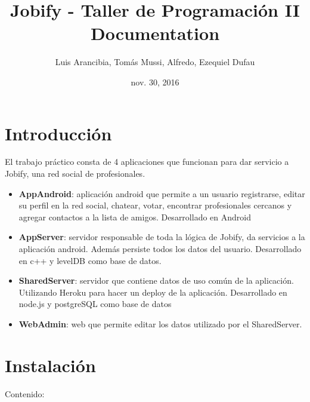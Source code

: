 \documentclass[letterpaper,10pt,spanish]{sphinxmanual}
\title{Jobify - Taller de Programación II Documentation}
\date{nov. 30, 2016}
\author{Luis Arancibia, Tomás Mussi, Alfredo, Ezequiel Dufau}
\begin{document}
\maketitle
\tableofcontents
{}\label{index::doc}



\chapter{Introducción}
\label{introduccion:welcome-to-jobify-taller-de-programacion-ii-s-documentation}\label{introduccion::doc}\label{introduccion:introduccion}
El trabajo práctico consta de 4 aplicaciones que funcionan para dar servicio a Jobify, una red social de profesionales.
\begin{itemize}
\item {} 
\textbf{AppAndroid}: aplicación android que permite a un usuario registrarse, editar su perfil en la red social, chatear, votar, encontrar profesionales cercanos y agregar contactos a la lista de amigos. Desarrollado en Android

\item {} 
\textbf{AppServer}: servidor responsable de toda la lógica de Jobify, da servicios a la aplicación android. Además persiste todos los datos del usuario. Desarrollado en c++ y levelDB como base de datos.

\item {} 
\textbf{SharedServer}: servidor que contiene datos de uso común de la aplicación. Utilizando Heroku para hacer un deploy de la aplicación. Desarrollado en node.js y postgreSQL como base de datos

\item {} 
\textbf{WebAdmin}: web que permite editar los datos utilizado por el SharedServer.

\end{itemize}


\chapter{Instalación}
\label{instalacion:instalacion}\label{instalacion::doc}
Contenido:
\end{document}
